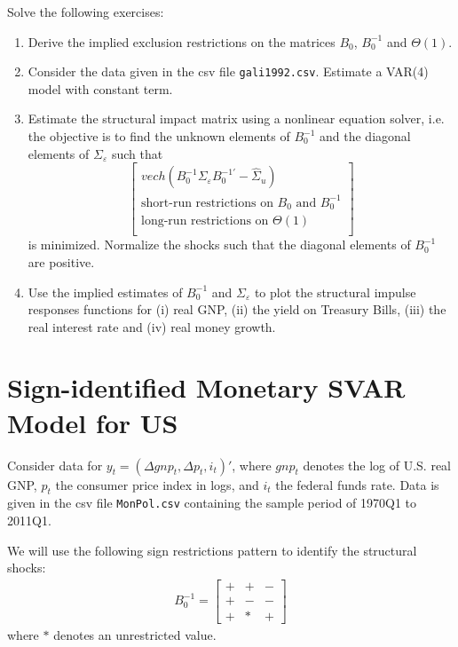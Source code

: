 \documentclass{article}
\begin{document}
Solve the following exercises:
\begin{enumerate}
	\item Derive the implied exclusion restrictions on the matrices $B_0$, $B_0^{-1}$ and $\Theta(1)$.
	\item Consider the data given in the csv file \texttt{gali1992.csv}.
	Estimate a VAR{(4)} model with constant term.
	\item Estimate the structural impact matrix using a nonlinear equation solver,
	  i.e. the objective is to find the unknown elements of $B_0^{-1}$ and the diagonal elements of $\Sigma_\varepsilon$ such that
	$$\begin{bmatrix}
	vech(B_0^{-1} \Sigma_\varepsilon B_0^{-1'}-\hat{\Sigma}_u)\\
	\text{short-run restrictions on }B_0 \text{ and } B_0^{-1} \\
	\text{long-run restrictions on }\Theta(1)\\
	\end{bmatrix}$$
	is minimized.
	Normalize the shocks such that the diagonal elements of $B_0^{-1}$ are positive.
	\item Use the implied estimates of $B_0^{-1}$ and $\Sigma_\varepsilon$ to plot the structural impulse responses functions
	for (i) real GNP, (ii) the yield on Treasury Bills, (iii) the real interest rate and (iv) real money growth.
\end{enumerate}

\newpage

\section[Sign-identified Monetary SVAR Model for US]{Sign-identified Monetary SVAR Model for US\label{ex:SignIdentifiedMonetarySVARUS}}
Consider data for $y_t = (\Delta gnp_t,\Delta p_t,i_t)'$,
  where $gnp_t$ denotes the log of U.S. real GNP,
  $p_t$ the consumer price index in logs,
  and $i_t$ the federal funds rate.
  Data is given in the csv file \texttt{MonPol.csv} containing the sample period of 1970Q1 to 2011Q1.

We will use the following sign restrictions pattern to identify the structural shocks:
\begin{align}
B_0^{-1}=\begin{bmatrix}
	+ & + & -\\
	+ & - & -\\
	+ & *  & +
	\label{eq:signpattern}
\end{bmatrix}
\end{align}
where $*$ denotes an unrestricted value.
\end{document}

